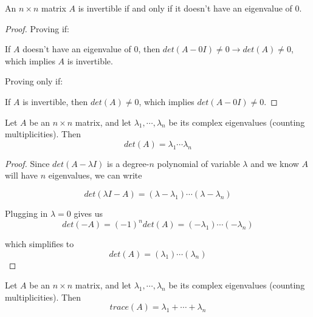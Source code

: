 \begin{theorem}
An $n \times n$ matrix $A$ is invertible if and only if it doesn't have an eigenvalue of 0. 
\end{theorem}

\begin{proof}
Proving if: 

If $A$ doesn't have an eigenvalue of 0, then $det(A - 0I) \neq 0 \rightarrow det(A) \neq 0$, which implies $A$ is invertible. 

Proving only if: 

If $A$ is invertible, then $det(A) \neq 0$, which implies $det(A - 0I) \neq 0$. 
\end{proof}

\begin{theorem}
Let $A$ be an $n \times n$ matrix, and let $\lambda_{1}, \cdots, \lambda_{n}$ be its complex eigenvalues (counting multiplicities). Then
$$det(A) = \lambda_{1} \cdots \lambda_{n}$$
\end{theorem}


\begin{proof}
Since $det(A - \lambda I)$ is a degree-$n$ polynomial of variable $\lambda$ and we know $A$ will have $n$ eigenvalues, we can write 

$$det(\lambda I - A) = (\lambda - \lambda_{1}) \cdots (\lambda - \lambda_{n})$$

Plugging in $\lambda = 0$ gives us 
$$det(-A) = (-1)^{n} det(A) = (- \lambda_{1}) \cdots (- \lambda_{n})$$ 

which simplifies to 
$$det(A) = (\lambda_{1}) \cdots (\lambda_{n})$$
\end{proof}


\begin{theorem}
Let $A$ be an $n \times n$ matrix, and let $\lambda_{1}, \cdots, \lambda_{n}$ be its complex eigenvalues (counting multiplicities). Then
$$trace(A) = \lambda_{1} + \cdots + \lambda_{n}$$ 
\end{theorem}

